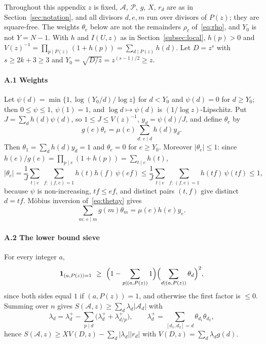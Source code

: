 \documentclass[preprint,11pt]{elsarticle}
\theoremstyle{definition}
\theoremstyle{remark}
\newcommand{\cA}{\mathcal{A}}
\newcommand{\cP}{\mathcal{P}}
\numberwithin{equation}{section}
\begin{document}
Throughout this appendix $z$ is fixed, $\cA$, $\cP$, $g$, $X$, $r_d$ are as
in Section~\ref{sec:notation}, and all divisors $d,e,m$ run over divisors
of $P(z)$; they are square-free. The weights $\theta_e$ below are not the
remainders $\rho_\ell$ of~\eqref{eq:rho}, and $Y_0$ is not $Y=N-1$. With
$h$ and $I(U,z)$ as in Section~\ref{subsec:local}, $h(p)>0$ and
$V(z)^{-1}=\prod_{p\mid P(z)}(1+h(p))=\sum_{d\mid P(z)}h(d)$.
Let $D=z^s$ with $s\ge2k+3\ge3$ and $Y_0=\sqrt{D/z}=z^{(s-1)/2}\ge z$.

\paragraph{A.1 Weights}
Let $\psi(d)=\min\{1,\log(Y_0/d)/\log z\}$ for $d<Y_0$ and $\psi(d)=0$ for $d\ge Y_0$;
then $0\le\psi\le1$, $\psi(1)=1$, and $\log d\mapsto \psi(d)$ is
$(1/\log z)$-Lipschitz. Put $J=\sum_d h(d)\psi(d)$, so $1\le J\le V(z)^{-1}$,
$y_d=\psi(d)/J$, and define $\theta_e$ by
\begin{equation}\label{eq:thetay}
  g(e)\theta_e=\mu(e)\sum_{d:\,e\mid d}h(d)y_d .
\end{equation}
Then $\theta_1=\sum_dh(d)y_d=1$ and $\theta_e=0$ for $e\ge Y_0$. Moreover
$|\theta_e|\le1$: since $h(e)/g(e)=\prod_{p\mid e}(1+h(p))=\sum_{t\mid e}h(t)$,
\[
  |\theta_e|=\frac1J\sum_{t\mid e}\ \sum_{f:\,(f,e)=1}h(t)h(f)\,\psi(ef)
  \le\frac1J\sum_{t\mid e}\ \sum_{f:\,(f,e)=1}h(tf)\,\psi(tf)\le1,
\]
because $\psi$ is non-increasing, $tf\le ef$, and distinct pairs $(t,f)$ give
distinct $d=tf$. M\"obius inversion of~\eqref{eq:thetay} gives
\begin{equation}\label{eq:Fe}
  \sum_{m:\,e\mid m}g(m)\theta_m=\mu(e)h(e)y_e .
\end{equation}

\paragraph{A.2 The lower bound sieve}
For every integer $a$,
\[
  \mathbf 1_{(a,P(z))=1}\ \ge\ \Bigl(1-\sum_{p\mid(a,P(z))}1\Bigr)
  \Bigl(\sum_{d\mid(a,P(z))}\theta_d\Bigr)^2 ,
\]
since both sides equal $1$ if $(a,P(z))=1$, and otherwise the first factor
is $\le0$. Summing over $n$ gives $S(\cA,z)\ge\sum_d\lambda_d|\cA_d|$ with
\[
  \lambda_d=\lambda^+_d-\sum_{p\mid d}\bigl(\lambda^+_d+\lambda^+_{d/p}\bigr),
  \qquad
  \lambda^+_d=\sum_{[d_1,d_2]=d}\theta_{d_1}\theta_{d_2},
\]
hence $S(\cA,z)\ge XV(D,z)-\sum_d|\lambda_d||r_d|$ with
$V(D,z)=\sum_d\lambda_dg(d)$.
\end{document}
